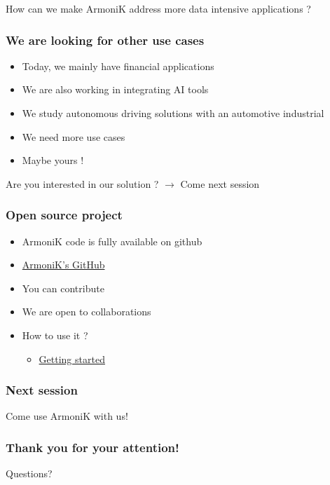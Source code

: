 \documentclass[10pt,aspectratio=1609]{beamer}
\begin{document}
\begin{section}{How can we make ArmoniK address more data intensive applications ?}
  \begin{frame}
    \frametitle{We are looking for other use cases}
    \begin{itemize}
      \item Today, we mainly have financial applications
      \item We are also working in integrating AI tools
      \item We study autonomous driving solutions with an automotive industrial
      \item We need more use cases
      \item Maybe yours !
    \end{itemize}
  \end{frame}

\end{section}

\begin{section}{Are you interested in our solution ? $\rightarrow$ Come next session}
  \begin{frame}
    \frametitle{Open source project}
    \begin{itemize}
      \item ArmoniK code is fully available on github
      \item \href{https://github.com/aneoconsulting/ArmoniK}{ArmoniK's GitHub}
      \item You can contribute
      \item We are open to collaborations
      \item How to use it ?
      \begin{itemize}
        \item \href{https://armonik.readthedocs.io/en/latest/content/armonik/getting-started.html}{Getting started}
      \end{itemize}
    \end{itemize}
  \end{frame}

  \begin{frame}
    \frametitle{Next session}

    Come use ArmoniK with us!

  \end{frame}

  \begin{frame}
    \frametitle{Thank you for your attention!}
    Questions?
  \end{frame}
\end{section}
\end{document}

